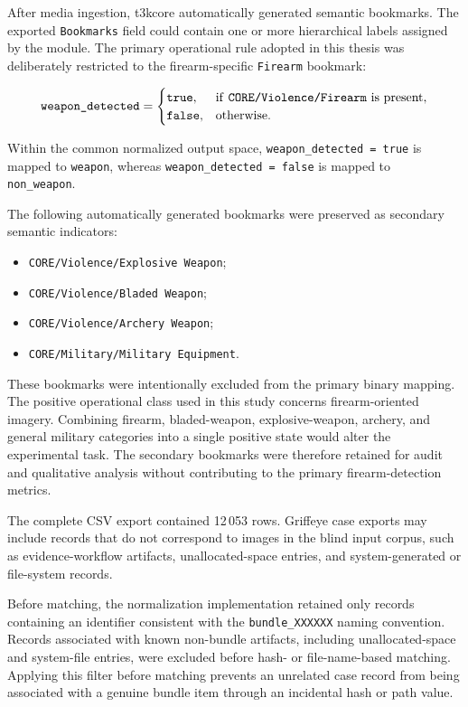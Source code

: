 After media ingestion, \gls{t3kcore} automatically generated semantic
bookmarks. The exported \texttt{Bookmarks} field could contain one or more
hierarchical labels assigned by the module. The primary operational rule
adopted in this thesis was deliberately restricted to the firearm-specific
\texttt{Firearm} bookmark:

\[
\texttt{weapon\_detected}
=
\begin{cases}
\texttt{true},
&
\text{if \texttt{CORE/Violence/Firearm} is present},
\\
\texttt{false},
&
\text{otherwise}.
\end{cases}
\]

Within the common normalized output space,
\texttt{weapon\_detected = true} is mapped to \texttt{weapon}, whereas
\texttt{weapon\_detected = false} is mapped to
\texttt{non\_weapon}.

The following automatically generated bookmarks were preserved as secondary
semantic indicators:

\begin{itemize}
\item \texttt{CORE/Violence/Explosive Weapon};
\item \texttt{CORE/Violence/Bladed Weapon};
\item \texttt{CORE/Violence/Archery Weapon};
\item \texttt{CORE/Military/Military Equipment}.
\end{itemize}

These bookmarks were intentionally excluded from the primary binary mapping.
The positive operational class used in this study concerns firearm-oriented
imagery. Combining firearm, bladed-weapon, explosive-weapon, archery, and
general military categories into a single positive state would alter the
experimental task. The secondary bookmarks were therefore retained for audit
and qualitative analysis without contributing to the primary firearm-detection
metrics.

The complete CSV export contained 12\,053 rows. Griffeye case exports may
include records that do not correspond to images in the blind input corpus,
such as evidence-workflow artifacts, unallocated-space entries, and
system-generated or file-system records.

Before matching, the normalization implementation retained only records
containing an identifier consistent with the
\texttt{bundle\_XXXXXX} naming convention. Records associated with known
non-bundle artifacts, including unallocated-space and system-file entries, were
excluded before hash- or file-name-based matching. Applying this filter before
matching prevents an unrelated case record from being associated with a
genuine bundle item through an incidental hash or path value.

